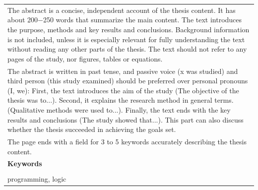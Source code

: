 \begin{table}
\begin{tabular} {|l|l|l|l|}
    \multicolumn{4}{|A|}{The abstract is a concise, independent account of the thesis content. It has about 200−250 words that summarize the main content. The text introduces the purpose, methods and key results and conclusions. Background information is not included, unless it is especially relevant for fully understanding the text without reading any other parts of the thesis. The text should not refer to any pages of the study, nor figures, tables or equations.} \\
    \multicolumn{4}{|A|}{The abstract is written in past tense, and passive voice (x was studied) and third person (this study examined) should be preferred over personal pronouns (I, we): First, the text introduces the aim of the study (The objective of the thesis was to...). Second, it explains the research method in general terms. (Qualitative methods were used to...). Finally, the text ends with the key results and conclusions (The study showed that...). This part can also discuss whether the thesis succeeded in achieving the goals set.} \\
    \multicolumn{4}{|A|}{The page ends with a field for 3 to 5 keywords accurately describing the thesis content.} \\
    \hline
    \multicolumn{4}{|l|}{\textbf{Keywords}} \\
    \multicolumn{4}{|l|}{} \\
    \multicolumn{4}{|l|}{programming, logic} \\
    \hline
\end{tabular}
\end{table}
